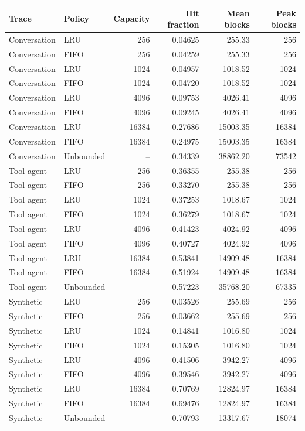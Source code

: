 \begin{tabular}{llrrrr}
\toprule
Trace & Policy & Capacity & Hit fraction & Mean blocks & Peak blocks\\
\midrule
Conversation & LRU & 256 & 0.04625 & 255.33 & 256\\
Conversation & FIFO & 256 & 0.04259 & 255.33 & 256\\
Conversation & LRU & 1024 & 0.04957 & 1018.52 & 1024\\
Conversation & FIFO & 1024 & 0.04720 & 1018.52 & 1024\\
Conversation & LRU & 4096 & 0.09753 & 4026.41 & 4096\\
Conversation & FIFO & 4096 & 0.09245 & 4026.41 & 4096\\
Conversation & LRU & 16384 & 0.27686 & 15003.35 & 16384\\
Conversation & FIFO & 16384 & 0.24975 & 15003.35 & 16384\\
Conversation & Unbounded & -- & 0.34339 & 38862.20 & 73542\\
\midrule
Tool agent & LRU & 256 & 0.36355 & 255.38 & 256\\
Tool agent & FIFO & 256 & 0.33270 & 255.38 & 256\\
Tool agent & LRU & 1024 & 0.37253 & 1018.67 & 1024\\
Tool agent & FIFO & 1024 & 0.36279 & 1018.67 & 1024\\
Tool agent & LRU & 4096 & 0.41423 & 4024.92 & 4096\\
Tool agent & FIFO & 4096 & 0.40727 & 4024.92 & 4096\\
Tool agent & LRU & 16384 & 0.53841 & 14909.48 & 16384\\
Tool agent & FIFO & 16384 & 0.51924 & 14909.48 & 16384\\
Tool agent & Unbounded & -- & 0.57223 & 35768.20 & 67335\\
\midrule
Synthetic & LRU & 256 & 0.03526 & 255.69 & 256\\
Synthetic & FIFO & 256 & 0.03662 & 255.69 & 256\\
Synthetic & LRU & 1024 & 0.14841 & 1016.80 & 1024\\
Synthetic & FIFO & 1024 & 0.15305 & 1016.80 & 1024\\
Synthetic & LRU & 4096 & 0.41506 & 3942.27 & 4096\\
Synthetic & FIFO & 4096 & 0.39546 & 3942.27 & 4096\\
Synthetic & LRU & 16384 & 0.70769 & 12824.97 & 16384\\
Synthetic & FIFO & 16384 & 0.69476 & 12824.97 & 16384\\
Synthetic & Unbounded & -- & 0.70793 & 13317.67 & 18074\\
\bottomrule
\end{tabular}
